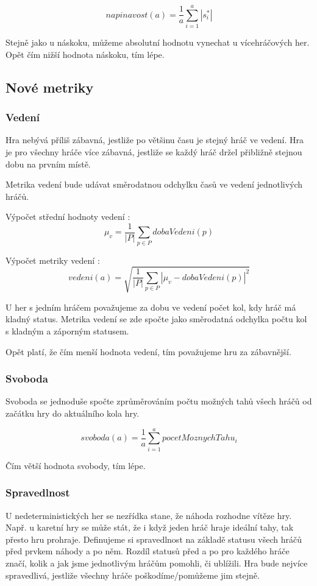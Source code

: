 	\[
	napinavost(a) = \frac{1}{a}\sum_{i=1}^a{|s^*_i|}
\]

Stejně jako u náskoku, můžeme absolutní hodnotu vynechat u vícehráčových her. Opět čím nižší hodnota náskoku, tím lépe.

\subsection{Nové metriky}

\subsubsection{Vedení}

Hra nebývá příliš zábavná, jestliže po většinu času je stejný hráč ve vedení. Hra je pro všechny hráče více zábavná, jestliže se každý hráč držel přibližně stejnou dobu na prvním místě.

Metrika vedení bude udávat směrodatnou odchylku časů ve vedení jednotlivých hráčů.

Výpočet střední hodnoty vedení :
	\[
	\mu_v = \frac{1}{|P|}\sum_{p \in P} dobaVedeni(p)
\]

Výpočet metriky vedení :
	\[
	vedeni(a) = \sqrt{\frac{1}{|P|}\sum_{p \in P} |\mu_v - dobaVedeni(p)|^2}
\]

U her s jedním hráčem považujeme za dobu ve vedení počet kol, kdy hráč má kladný status. Metrika vedení se zde spočte jako směrodatná odchylka počtu kol s kladným a záporným statusem.

Opět platí, že čím menší hodnota vedení, tím považujeme hru za zábavnější.

\subsubsection{Svoboda}

Svoboda se jednoduše spočte zprůměrováním počtu možných tahů všech hráčů od začátku hry do aktuálního kola hry.

\[
	svoboda(a) = \frac{1}{a}\sum_{i=1}^a{pocetMoznychTahu_i}
\]

Čím větší hodnota svobody, tím lépe.

\subsubsection{Spravedlnost}

U nedeterministických her se nezřídka stane, že náhoda rozhodne vítěze hry. Např. u karetní hry se může stát, že i když jeden hráč hraje ideální tahy, tak přesto hru prohraje. Definujeme si spravedlnost na základě statusu všech hráčů před prvkem náhody a po něm. Rozdíl statusů před a po pro každého hráče značí, kolik a jak jsme jednotlivým hráčům pomohli, či ublížili. Hra bude nejvíce spravedlivá, jestliže všechny hráče poškodíme/pomůžeme jim stejně.

